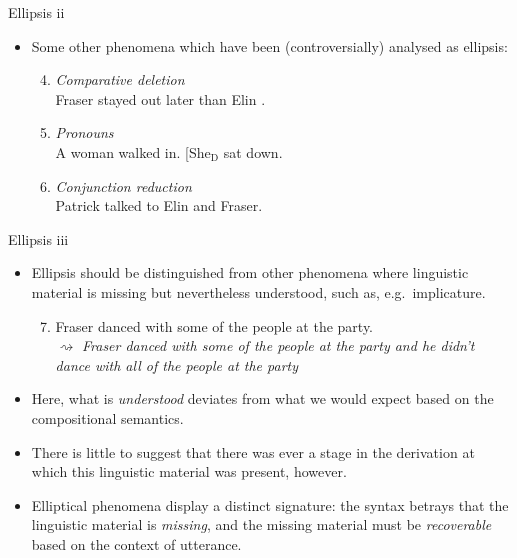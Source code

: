 \documentclass[ignorenonframetext,]{beamer}
\providecommand{\tightlist}{%
  \setlength{\itemsep}{0pt}\setlength{\parskip}{0pt}}
\begin{document}
\begin{frame}{%
\protect\hypertarget{ellipsis-ii}{%
Ellipsis ii}}

\begin{itemize}
\item
  Some other phenomena which have been (controversially) analysed as
  ellipsis:

  \begin{enumerate}
  [(1)]
  \setcounter{enumi}{3}
  \item
    \emph{Comparative deletion}\\
    Fraser stayed out later than Elin .
  \item
    \emph{Pronouns}\\
    A woman walked in. {[}She\(_{\text{D}}\) \elide{woman}{]} sat down.
  \item
    \emph{Conjunction reduction}\\
    Patrick talked to Elin and  Fraser.
  \end{enumerate}
\end{itemize}

\end{frame}

\begin{frame}{%
\protect\hypertarget{ellipsis-iii}{%
Ellipsis iii}}

\begin{itemize}
\item
  Ellipsis should be distinguished from other phenomena where linguistic
  material is missing but nevertheless understood, such as,
  e.g.~implicature.

  \begin{enumerate}
  [(1)]
  \setcounter{enumi}{6}
  \tightlist
  \item
    Fraser danced with some of the people at the party.\\
    \(\rightsquigarrow\) \emph{Fraser danced with some of the people at
    the party and he didn’t dance with all of the people at the party}
  \end{enumerate}
\item
  Here, what is \emph{understood} deviates from what we would expect
  based on the compositional semantics.
\item
  There is little to suggest that there was ever a stage in the
  derivation at which this linguistic material was present, however.
\item
  Elliptical phenomena display a distinct signature: the syntax betrays
  that the linguistic material is \emph{missing}, and the missing
  material must be \emph{recoverable} based on the context of utterance.
\end{itemize}

\end{frame}
\end{document}
